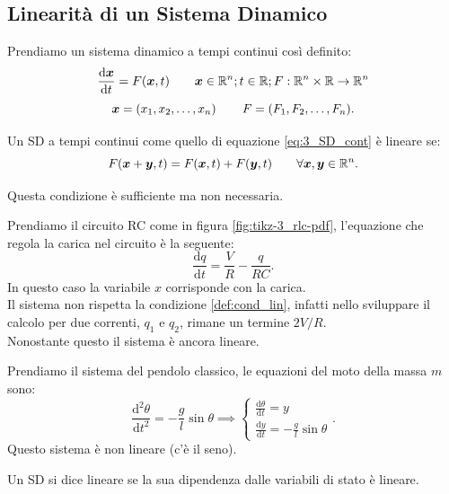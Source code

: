 \subsection{Linearità di un Sistema Dinamico}%
\label{sub:Linearità di un Sistema Dinamico}
Prendiamo un sistema dinamico a tempi continui così definito:
\begin{equation}
    \frac{\text{d} \boldsymbol{x}}{\text{d} t} = F(\boldsymbol{x}, t) \qquad \boldsymbol{x}  \in \mathbb{R}^n; t \in \mathbb{R}; F: \mathbb{R}^n\times \mathbb{R} \to \mathbb{R}^n
    \label{eq:3_SD_cont}
\end{equation}
\[
    \boldsymbol{x}  = \left(x_1, x_2, \ldots, x_n\right) \qquad F = (F_1, F_2, \ldots, F_n)
.\] 
\begin{defn}
    \label{def:cond_lin}
    Un SD a tempi continui come quello di equazione \ref{eq:3_SD_cont} è lineare se:
    \[
	F(\boldsymbol{x}  + \boldsymbol{y}, t) = F(\boldsymbol{x}, t) + F(\boldsymbol{y}, t) \qquad \forall \boldsymbol{x}, \boldsymbol{y}  \in \mathbb{R}^n
    .\] 
\end{defn}
\noindent
Questa condizione è sufficiente ma non necessaria.
\begin{exmp}[Circuito RC]
    Prendiamo il circuito RC come in figura \ref{fig:tikz-3_rlc-pdf}, l'equazione che regola la carica nel circuito è la seguente:
    \[
        \frac{\text{d} q}{\text{d} t} = \frac{V}{R}-\frac{q}{RC}
    .\] 
    In questo caso la variabile $x$ corrisponde con la carica.\\
    Il sistema non rispetta la condizione \ref{def:cond_lin}, infatti nello sviluppare il calcolo per due correnti, $q_1$ e $q_2$, rimane un termine $2V / R$. \\
    Nonostante questo il sistema è ancora lineare.
\end{exmp}
\noindent
\begin{exmp}[Pendolo]
    Prendiamo il sistema del pendolo classico, le equazioni del moto della massa $m$ sono:
    \[
	\frac{\text{d} ^2\theta}{\text{d} t^2} = -\frac{g}{l}\sin\theta \implies
        \begin{cases}
	    \frac{\text{d} \theta}{\text{d} t} = y\\
	    \frac{\text{d} y}{\text{d} t} = - \frac{g}{l}\sin\theta
        \end{cases}
    .\] 
    Questo sistema è non lineare (c'è il seno).
\end{exmp}
\noindent
\begin{defn}
    Un SD si dice lineare se la sua dipendenza dalle variabili di stato è lineare.
\end{defn}
\noindent
